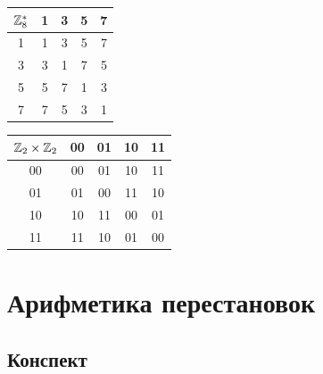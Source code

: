 \begin{enumerate}
\begin{center}
\begin{tabular}{c|cccc}
$\mathbb Z_8^*$ & 1 & 3 & \cellcolor{lightRed} 5 & 7 \\  \hline
1 & 1 & 3 & 5 & 7 \\
3 & 3 & 1 & 7 & 5\\
5 & 5 & 7 & 1 & 3\\
7 & 7 & \cellcolor{lightRed} 5 & 3 & 1
\end{tabular}
\qquad
\begin{tabular}{c|cccc}
$\mathbb Z_2\times\mathbb Z_2$ & 00 & 01 & \cellcolor{lightRed} 10 & 11\\  \hline
00 & 00 & 01 & 10 & 11 \\
01 & 01 & 00 & 11 & 10 \\
10 & 10 & 11 & 00 & 01 \\
11 & 11 & \cellcolor{lightRed} 10 & 01 & 00
\end{tabular}
\end{center}

\end{enumerate}





\section{Арифметика перестановок}

\subsection*{Конспект}

